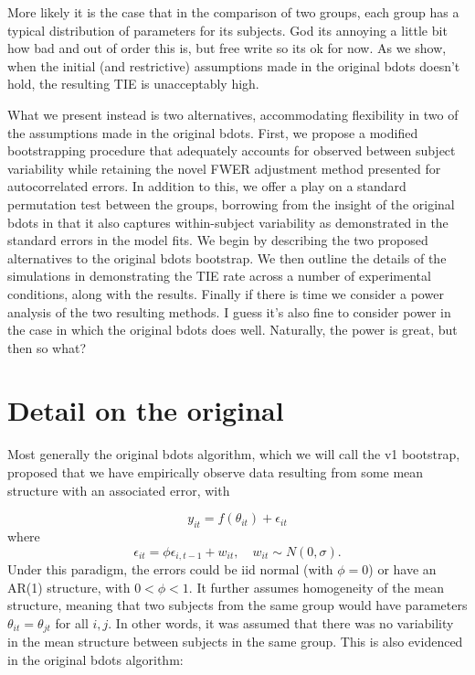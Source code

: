 \documentclass{article}
\begin{document}
More likely it is the case that in the comparison of two groups, each group has a typical distribution of parameters for its subjects. God its annoying a little bit how bad and out of order this is, but free write so its ok for now. As we show, when the initial (and restrictive) assumptions made in the original bdots doesn't hold, the resulting TIE is unacceptably high.

What we present instead is two alternatives, accommodating flexibility in two of the assumptions made in the original bdots. First, we propose a modified bootstrapping procedure that adequately accounts for observed between subject variability while retaining the novel FWER adjustment method presented for autocorrelated errors. In addition to this, we offer a play on a standard permutation test between the groups, borrowing from the insight of the original bdots in that it also captures within-subject variability as demonstrated in the standard errors in the model fits. We begin by describing the two proposed alternatives to the original bdots bootstrap. We then outline the details of the simulations in demonstrating the TIE rate across a number of experimental conditions, along with the results. Finally if there is time we consider a power analysis of the two resulting methods. I guess it's also fine to consider power in the case in which the original bdots does well. Naturally, the power is great, but then so what?

\section{Detail on the original}

Most generally the original bdots algorithm, which we will call the v1 bootstrap, proposed that we have empirically observe data resulting from some mean structure with an associated error, with 

\begin{equation}
y_{it} = f(\theta_{it}) + \epsilon_{it}
\end{equation}
where 
\begin{equation}
\epsilon_{it} = \phi \epsilon_{i, t-1} + w_{it}, \quad w_{it} \sim N(0, \sigma).
\end{equation}
Under this paradigm, the errors could be iid normal (with $\phi = 0$) or have an AR(1) structure, with $0 < \phi < 1$. It further assumes homogeneity of the mean structure, meaning that two subjects from the same group would have parameters $\theta_{it} = \theta_{jt}$ for all $i, j$. In other words, it was assumed that there was no variability in the mean structure between subjects in the same group. This is also evidenced in the original bdots algorithm: 
\end{document}
